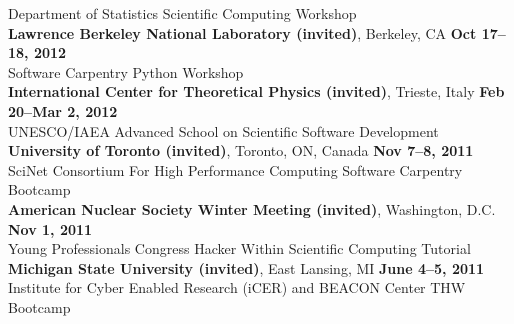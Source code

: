 \documentclass[margin,line]{resume}
\begin{document}
\begin{resume}
    Department of Statistics Scientific Computing Workshop
               \vspace{2mm}\\
    \textbf{Lawrence Berkeley National Laboratory (invited)}, Berkeley, CA \hfill \textbf{Oct 17--18, 2012}\\
    Software Carpentry Python Workshop
               \vspace{2mm}\\
    \textbf{International Center for Theoretical Physics (invited)}, Trieste, Italy \hfill \textbf{Feb 20--Mar 2, 2012}\\
    UNESCO/IAEA Advanced School on Scientific Software Development
               \vspace{2mm}\\
    \textbf{University of Toronto (invited)}, Toronto, ON, Canada \hfill \textbf{Nov 7--8, 2011}\\
    SciNet Consortium For High Performance Computing Software Carpentry Bootcamp
               \vspace{2mm}\\
    \textbf{American Nuclear Society Winter Meeting (invited)}, Washington, D.C.  \hfill \textbf{Nov 1, 2011}\\
    Young Professionals Congress Hacker Within Scientific Computing Tutorial
               \vspace{2mm}\\
    \textbf{Michigan State University (invited)}, East Lansing, MI \hfill \textbf{June 4--5, 2011}\\
    Institute for Cyber Enabled Research (iCER) and BEACON Center THW Bootcamp


\end{resume}
\end{document}
